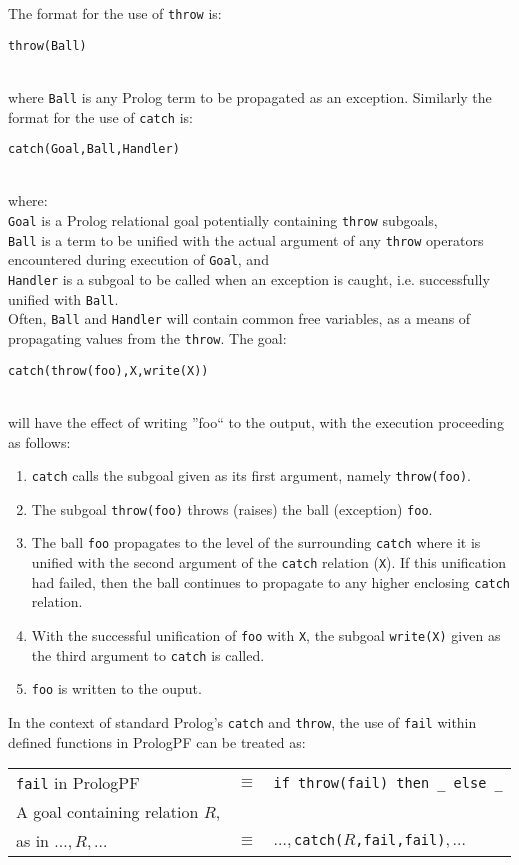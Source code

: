 The format for the use of \texttt{throw} is:\\
\centerline{\texttt{throw(Ball)}}\\
where \texttt{Ball} is any Prolog term to be propagated as an exception.
Similarly the format for the use of \texttt{catch} is:\\
\centerline{\texttt{catch(Goal,Ball,Handler)}}\\
where:\\
\texttt{Goal} is a Prolog relational goal potentially containing
\texttt{throw} subgoals,\\
\texttt{Ball} is a term to be unified with the actual argument of any
\texttt{throw} operators encountered during execution of \texttt{Goal}, and\\
\texttt{Handler} is a subgoal to be called when an exception is
caught, i.e. successfully unified with \texttt{Ball}.\\
Often, \texttt{Ball} and \texttt{Handler} will contain common free
variables, as a means of propagating values from the \texttt{throw}.
The goal:\\
\centerline{\texttt{catch(throw(foo),X,write(X))}}\\
will have the effect of writing ''foo`` to the output, with the
execution proceeding as follows:
\begin{enumerate}
\item{\texttt{catch} calls the subgoal given as its first argument,
  namely \texttt{throw(foo)}.}
\item{The subgoal \texttt{throw(foo)} throws (raises) the ball (exception)
  \texttt{foo}.}
\item{The ball \texttt{foo} 
  propagates to the level of the surrounding \texttt{catch}
  where it is unified with the second argument of the \texttt{catch}
  relation (\texttt{X}).  If this unification had failed, then the ball
  continues to propagate to any higher enclosing \texttt{catch} relation.}
\item{With the successful unification of \texttt{foo} with \texttt{X},
  the subgoal \texttt{write(X)}
  given as the third argument to \texttt{catch} is called.}
\item{\texttt{foo} is written to the ouput.}
\end{enumerate}
In the context of standard Prolog's \texttt{catch} and \texttt{throw},
the use of \texttt{fail} within defined functions in PrologPF can be 
treated as:\\

\begin{tabular}{l l l}
\texttt{fail} in PrologPF       &$\equiv$ &\texttt{if throw(fail) then \_{} else \_{}}\\[4mm]
A goal containing relation $R$, &         &\\
as in $\ldots,R,\ldots$         &$\equiv$ &$\ldots,$\texttt{catch(}$R$\texttt{,fail,fail)}$,\ldots$\\
\end{tabular}

